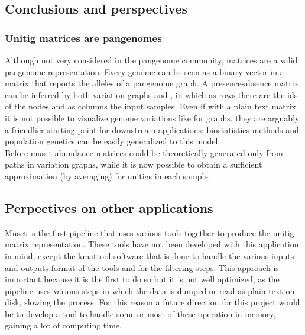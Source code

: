 \subsection{Conclusions and perspectives}
\subsubsection{Unitig matrices are pangenomes}
Although not very considered in the pangenome community, matrices are a valid pangenome representation. Every genome can be seen as a binary vector in a matrix that reports the alleles of a pangenome graph. A presence-absence matrix can be inferred by both variation graphs and \ccdbgs, in which as rows there are the ids of the nodes and as columns the input samples.  
Even if with a plain text matrix it is not possible to visualize genome variations like for graphs, they are arguably a friendlier starting point for downstream applications: biostatistics methods and population genetics can be easily generalized to this model.\\
Before muset abundance matrices could be theoretically generated only from paths in variation graphs, while it is now possible to obtain a sufficient approximation (by averaging) for unitigs in each sample.\\
\subsection{Perpectives on other applications}
Muset is the first pipeline that uses various tools together to produce the unitig matrix representation. These tools have not been developed with this application in mind, except the kmattool software that is done to handle the various inputs and outputs format of the tools and for the filtering steps. This approach is important because it is the first to do so but it is not well optimized, as the pipeline uses various steps in which the data is dumped or read as plain text on disk, slowing the process. For this reason a future direction for this project would be to develop a tool to handle some or most of these operation in memory, gaining a lot of computing time.\\


